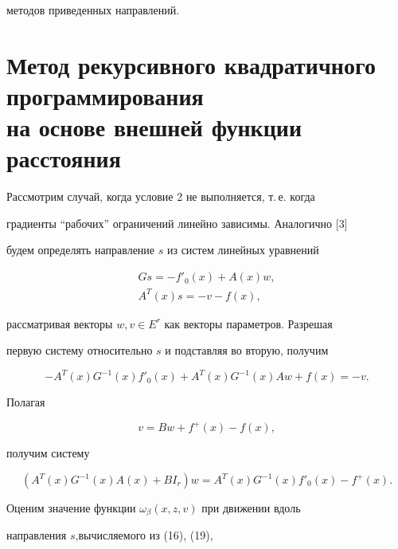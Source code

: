 методов приведенных направлений. 


 


\section{Метод рекурсивного квадратичного программирования\protect\\ 


на основе внешней функции расстояния} 


 


Рассмотрим случай, когда условие 2 не выполняется, т.\,е.{} когда 


градиенты ``рабочих'' ограничений линейно зависимы. Аналогично [3] 


будем определять направление $s$ из систем линейных уравнений 


\begin{gather} 


G s=-f'_0(x)+A(x)w,\\ 


A^T(x)s=-v-f(x), 


\end{gather} 


рассматривая векторы $w,v\in E^r$ как векторы параметров. Разрешая 


первую систему относительно $s$ и подставляя во вторую, получим 


$$ 


-A^T(x)G^{-1}(x)f'_0(x)+A^T(x)G^{-1}(x)A w+f(x)=-v. 


$$ 


Полагая 


\begin{equation} 


v=B w+f^+(x)-f(x), 


\end{equation} 


получим систему 


\begin{equation} 


(A^T(x)G^{-1}(x)A(x)+B I_r)w=A^T(x)G^{-1}(x)f'_0(x)-f^+(x). 


\end{equation} 


 


Оценим значение функции $\omega_\beta(x,z,v)$ при движении вдоль 


направления $s$,вычисляемого из (16), (19), 


